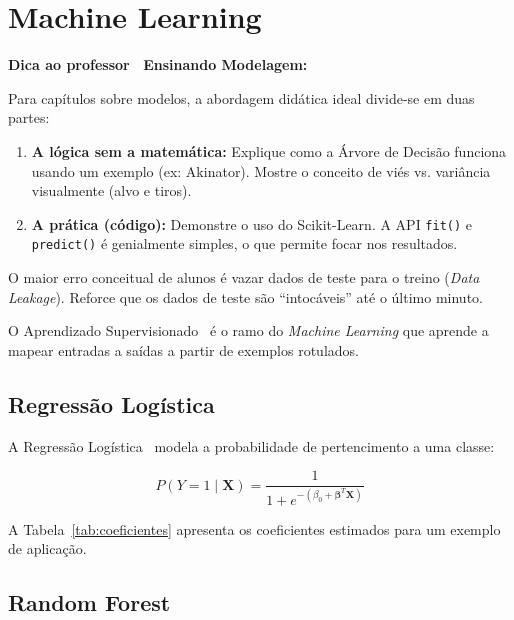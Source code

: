 \documentclass[
    12pt,
    oneside,
    a4paper,
    english,
    brazilian
    ]{abntex2}
\numberwithin{equation}{chapter}
\newenvironment{dica}{%
    \par\medskip
    \color{blue!60!black}\small\itshape
}{%
    \par\medskip
}
\begin{document}
\chapter{Machine Learning}

\begin{dica}
\noindent\textbf{Dica ao professor \textemdash\ Ensinando Modelagem:}

Para capítulos sobre modelos, a abordagem didática ideal divide-se em duas partes:
\begin{enumerate}
    \item \textbf{A lógica sem a matemática:} Explique como a Árvore de Decisão funciona usando um exemplo (ex: Akinator). Mostre o conceito de viés vs. variância visualmente (alvo e tiros).
    \item \textbf{A prática (código):} Demonstre o uso do Scikit-Learn. A API \texttt{fit()} e \texttt{predict()} é genialmente simples, o que permite focar nos resultados.
\end{enumerate}
O maior erro conceitual de alunos é vazar dados de teste para o treino (\textit{Data Leakage}). Reforce que os dados de teste são ``intocáveis'' até o último minuto.
\end{dica}

O Aprendizado Supervisionado~\cite{hastie2009} é o ramo do \textit{Machine Learning} que aprende a mapear entradas a saídas a partir de exemplos rotulados.

\section{Regressão Logística}

A Regressão Logística~\cite{james2023} modela a probabilidade de pertencimento a uma classe:

\begin{equation}
    P(Y = 1 \mid \mathbf{X}) = \frac{1}{1 + e^{-(\beta_0 + \boldsymbol{\beta}^T \mathbf{X})}}
    \label{eq:logistic}
\end{equation}

A Tabela~\ref{tab:coeficientes} apresenta os coeficientes estimados para um exemplo de aplicação.



\section{Random Forest}
\end{document}
